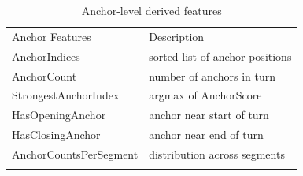 \begin{longtable}[]{@{}
  >{\raggedright\arraybackslash}p{}
  >{\raggedright\arraybackslash}p{}@{}}
\caption{Anchor-level derived features}\label{tab:anchor-level-features}\\
\toprule\noalign{}
\begin{minipage}[b]{\linewidth}\centering
Anchor Features
\end{minipage} & \begin{minipage}[b]{\linewidth}\centering
Description
\end{minipage} \\
\begin{minipage}[b]{\linewidth}\raggedright
AnchorIndices
\end{minipage} & \begin{minipage}[b]{\linewidth}\raggedright
sorted list of anchor positions
\end{minipage} \\
\begin{minipage}[b]{\linewidth}\raggedright
AnchorCount
\end{minipage} & \begin{minipage}[b]{\linewidth}\raggedright
number of anchors in turn
\end{minipage} \\
\begin{minipage}[b]{\linewidth}\raggedright
StrongestAnchorIndex
\end{minipage} & \begin{minipage}[b]{\linewidth}\raggedright
argmax of AnchorScore
\end{minipage} \\
\begin{minipage}[b]{\linewidth}\raggedright
HasOpeningAnchor
\end{minipage} & \begin{minipage}[b]{\linewidth}\raggedright
anchor near start of turn
\end{minipage} \\
\begin{minipage}[b]{\linewidth}\raggedright
HasClosingAnchor
\end{minipage} & \begin{minipage}[b]{\linewidth}\raggedright
anchor near end of turn
\end{minipage} \\
\begin{minipage}[b]{\linewidth}\raggedright
AnchorCountsPerSegment
\end{minipage} & \begin{minipage}[b]{\linewidth}\raggedright
distribution across segments
\end{minipage} \\
\midrule\noalign{}
\endhead
\bottomrule\noalign{}
\endlastfoot
\end{longtable}


